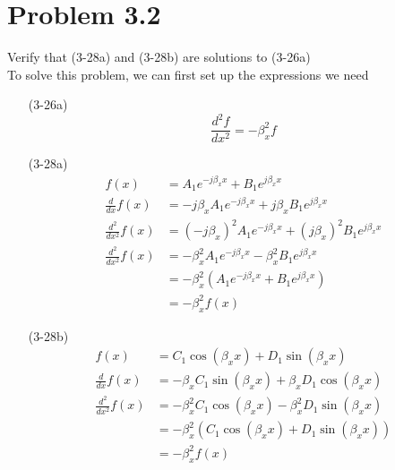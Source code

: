 \documentclass[12pt]{article}
\begin{document}
\section*{Problem 3.2}
Verify that (3-28a) and (3-28b) are solutions to (3-26a)\\
To solve this problem, we can first set up the expressions we need
\begin{itemize}
\item[(3-26a)]
  \begin{equation}
    \frac{d^2f}{dx^2} = -\beta_x^2f\label{deriv_expression}
  \end{equation}
\item[(3-28a)]
  \begin{align*}
    f(x) &= A_1e^{-j\beta_xx} + B_1e^{j\beta_xx}\\
    \frac{d}{dx}f(x) &= -j\beta_xA_1e^{-j\beta_xx} + j\beta_xB_1e^{j\beta_xx}\\
    \frac{d^2}{dx^2}f(x) &= (-j\beta_x)^2A_1e^{-j\beta_xx} + (j\beta_x)^2B_1e^{j\beta_xx}\\
    \frac{d^2}{dx^2}f(x) &= -\beta_x^2A_1e^{-j\beta_xx} - \beta_x^2B_1e^{j\beta_xx}\\
         &= - \beta_x^2(A_1e^{-j\beta_xx} + B_1e^{j\beta_xx})\\
         &=- \beta_x^2 f(x)
  \end{align*}
  \item[(3-28b)]
\begin{align*}
  f(x) &= C_1\cos{(\beta_xx)} + D_1\sin{(\beta_xx)}\\
  \frac{d}{dx}f(x) &= -\beta_xC_1\sin{(\beta_xx)} + \beta_xD_1\cos{(\beta_xx)} \\
  \frac{d^2}{dx^2}f(x) &= -\beta_x^2C_1\cos{(\beta_xx)} - \beta_x^2D_1\sin{(\beta_xx) } \\
       &= - \beta_x^2(C_1\cos{(\beta_xx)} + D_1\sin{(\beta_xx) }) \\
       &= - \beta_x^2 f(x)
\end{align*}
\end{itemize}
\end{document}
